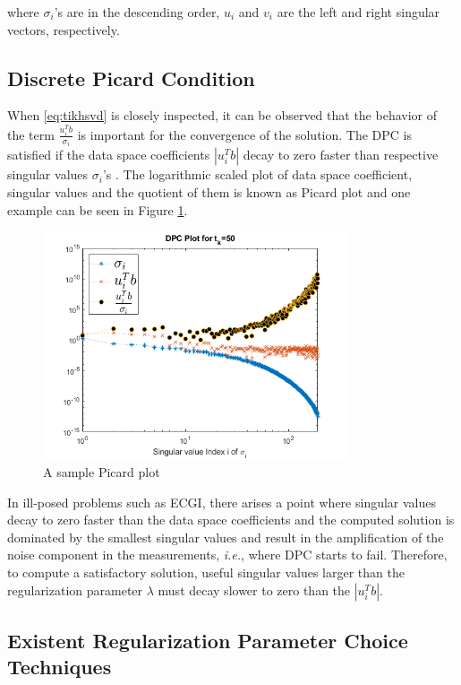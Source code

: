 \documentclass[draftcls, onecolumn, journal]{IEEEtran}
\begin{document}
where $\sigma_i$'s are in the descending order, $u_i$ and $v_i$ are the left and right singular vectors, respectively.

\subsection{Discrete Picard Condition} \label{subsec:DPC}

When \eqref{eq:tikhsvd} is closely inspected, it can be observed that the behavior of the term $\frac{u_i^Tb}{\sigma_i}$ is important for the convergence of the solution. The DPC is satisfied if the data space coefficients $|u_i^Tb|$ decay to zero faster than respective singular values $\sigma_i$'s \cite*{chamorro2017improving}. The logarithmic scaled plot of data space coefficient, singular values and the quotient of them is known as Picard plot and one example can be seen in Figure \ref*{fig:PicardPlot}.

\begin{figure}[h]
\centering
\includegraphics[width=0.8\textwidth]{../images/PicardPlot.png}
\caption{A sample Picard plot}\label{fig:PicardPlot}
\end{figure}

In ill-posed problems such as ECGI, there arises a point where singular values decay to zero faster than the data space coefficients and the computed solution is dominated by the smallest singular values and result in the amplification of the noise component in the measurements, \textit{i.e.}, where DPC starts to fail. Therefore, to compute a satisfactory solution, useful singular values larger than the regularization parameter $\lambda$ must decay slower to zero than the $|u_i^Tb|$.  

\newpage
\subsection{Existent Regularization Parameter Choice Techniques}\label{subsec:paramselect}
\end{document}
